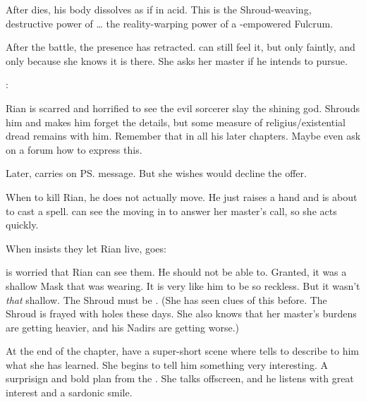 \begin{changes}
    After \Teshrial{} dies, his body dissolves as if in acid. 
    This is the Shroud-weaving, destructive power of \Rystessakhin\ldots{} the reality-warping power of a \xs-empowered Fulcrum.  
    
    After the battle, the \noggyal presence has retracted. 
    \Criseis can still feel it, but only faintly, and only because she knows it is there.
    She asks her master if he intends to pursue.
    
    \Ishnaruchaefir:
    
    Rian is scarred and horrified to see the evil sorcerer slay the shining god. 
    \Criseis Shrouds him and makes him forget the details, but some measure of religius/existential dread remains with him. 
    Remember that in all his later chapters.
    Maybe even ask on a forum how to express this. 
    
    Later, \Achsah{} carries on \ps{\Ishnaruchaefir} message. 
    But she wishes \Teshrial{} would decline the offer. 
    
    When \Ishnaruchaefir {} to kill Rian, he does not actually move.
    He just raises a hand and is about to cast a spell.
    \Criseis can see the \daemons moving in to answer her master's call, so she acts quickly.

    \begin{comment}
      \subparagraph{Aftermath}
    \end{comment}
    When \Criseis{} insists they let Rian live, \Ishnaruchaefir{} goes:
    
    \Criseis{} is worried that Rian can see them. 
    He should not be able to. 
    Granted, it was a shallow Mask that \Ishnaruchaefir{} was wearing. 
    It is very like him to be so reckless. 
    But it wasn't \emph{that} shallow. 
    The Shroud must be . 
    (She has seen clues of this before. 
     The Shroud is frayed with holes these days.
     She also knows that her master's burdens are getting heavier, and his Nadirs are getting worse.)
     
    
    At the end of the chapter, have a super-short scene where \Ishnaruchaefir tells \Criseis to describe to him what she has learned.
    She begins to tell him something very interesting.
    A surprisign and bold plan from the \resphain.
    She talks offscreen, and he listens with great interest and a sardonic smile.


\end{changes}
